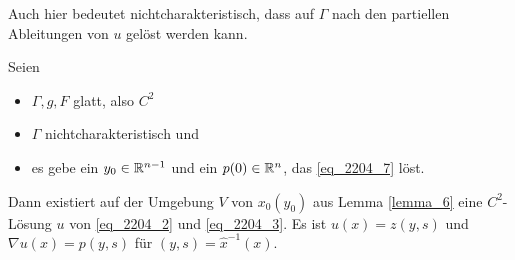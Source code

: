 \begin{bem} \label{bem_8}
	Auch hier bedeutet nichtcharakteristisch,\marginnote{[7]} dass auf $\Gamma$ nach den partiellen Ableitungen von $u$ gelöst werden kann.
\end{bem}
	
\begin{thm}
\label{thm_lok_existenz} \label{thm_8}
	Seien \marginnote{[8]} \begin{itemize}
		\item $\Gamma, g, F$ glatt, also $C^2$
		\item $\Gamma$ nichtcharakteristisch und
		\item es gebe ein $y_0 \in \mathbb{R}^{n-1}$ und ein $p(0) \in \mathbb{R}^n$, das \eqref{eq_2204_7} löst.
	\end{itemize}
	Dann existiert auf der Umgebung $V$ von $x_0(y_0)$ aus Lemma \ref{lemma_6} eine $C^2$-Lösung $u$ von \eqref{eq_2204_2} und \eqref{eq_2204_3}. Es ist $u(x) = z(y,s)$ und $\nabla u(x) = p(y,s)$ für $(y,s) = \widehat{x}^{-1} (x)$.
\end{thm}

